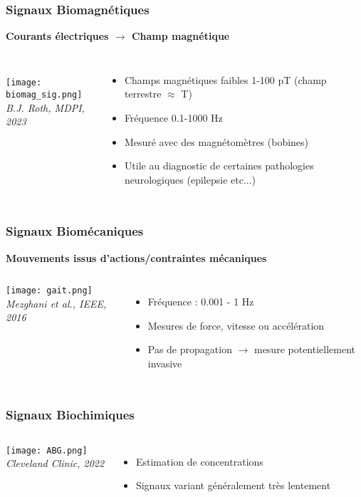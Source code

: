 \documentclass{beamer}
\begin{document}
\begin{frame}
\frametitle{Signaux Biomagnétiques}
\textbf{Courants électriques $\rightarrow$ Champ magnétique}
\begin{columns}
\column{60mm}
\vspace{0.2cm}\\
 \texttt{[image: biomag\_sig.png]}\\
 \vspace{0.1cm}
 \textit{B.J. Roth, MDPI, 2023}
\column{60mm}
\begin{itemize}
\item Champs magnétiques faibles 1-100 pT (champ terrestre $\approx$  \textmu T)
\vspace{0.2cm}
\item Fréquence 0.1-1000 Hz
\vspace{0.2cm}
\item Mesuré avec des magnétomètres (bobines)
\vspace{0.2cm}
\item Utile au diagnostic de certaines pathologies neurologiques (epilepsie etc...)
\end{itemize}

\end{columns}
\end{frame}

\begin{frame}
\frametitle{Signaux Biomécaniques}
\textbf{Mouvements issus d'actions/contraintes mécaniques}
\begin{columns}
\column{60mm}
 \texttt{[image: gait.png]}\\
 \vspace{0.1cm}
 \textit{Mezghani et al., IEEE, 2016}

\column{60mm}
\begin{itemize}
\item Fréquence : 0.001 - 1 Hz
\vspace{0.2cm}
\item Mesures de force, vitesse ou accélération 
\vspace{0.2cm}
\item Pas de propagation $\rightarrow$ mesure potentiellement invasive
\vspace{0.2cm}
\end{itemize}
\end{columns}
\end{frame}

\begin{frame}
\frametitle{Signaux Biochimiques}
\begin{columns}
\column{60mm}
 \texttt{[image: ABG.png]}\\
 \vspace{0.1cm}
 \textit{Cleveland Clinic, 2022}
\column{60mm}
\begin{itemize}
\item Estimation de concentrations
\vspace{0.2cm}
\item Signaux variant généralement très lentement
\end{itemize}
\end{columns}
\end{frame}
\end{document}
